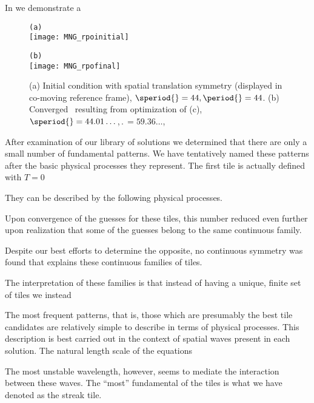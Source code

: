 \begin{itemize}
{In  we demonstrate a

\begin{figure}
\begin{minipage}[height=.05\textheight]{.5\textwidth}
\centering
\small{\texttt{(a)}} \\
\texttt{[image: MNG\_rpoinitial]}
\end{minipage}
\begin{minipage}[height=.2\textheight]{.5\textwidth}
\centering
\small{\texttt{(b)}} \\
\texttt{[image: MNG\_rpofinal]}
\end{minipage}
\caption{ \label{fig:rpo1}
(a) Initial condition with spatial translation symmetry
(displayed in co-moving reference frame),
$\speriod{}=44,\period{}=44$. (b) Converged \twot\ resulting from optimization
of (c), $\speriod{} = 44.01\dots$,$\period{}=59.36\dots$,}
\end{figure}


After examination of our library of solutions we determined that there are
only a small number of fundamental patterns. We have tentatively named
these patterns after the basic physical processes they represent.
The first tile is actually defined with $T=0$

They can be described by the
following physical processes.


Upon convergence of the
guesses for these tiles, this number reduced even further upon realization
that some of the guesses belong to the same continuous family.

Despite our best efforts to determine the opposite, no continuous symmetry
was found that explains these continuous families of tiles.

The interpretation of these families is that instead of having a unique, finite set of tiles
we instead

The most frequent patterns, that is, those which are presumably the best tile
candidates are relatively simple to describe in terms of physical processes.
This description is best carried out in the context of spatial waves present
in each solution. The natural length scale of the equations

The most unstable wavelength, however, seems to mediate the interaction between these
waves.
The ``most'' fundamental of the tiles is what we have denoted as the streak tile.


}
\end{itemize}
